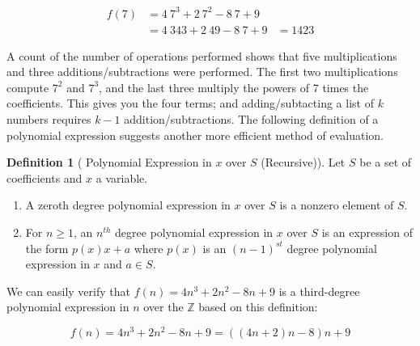 \documentclass[10pt,]{book}
\theoremstyle{plain}
\theoremstyle{definition}
\newtheorem{definition}[theorem]{Definition}
\theoremstyle{definition}
\theoremstyle{definition}
\theoremstyle{definition}
\numberwithin{equation}{section}
\begin{document}
\begin{equation*}
\begin{split}
f(7) &= 4\ 7^3 + 2\ 7^2 - 8\ 7 + 9\\
			&=4\ 343 +2\ 49 -8\ 7+9 
			&= 1423
\end{split}
\end{equation*}
%
\par
A count of the number of operations performed shows that five multiplications and three additions/subtractions were performed. The first two multiplications compute \(7^2\) and \(7^3\), and the last three multiply the powers of 7 times the coefficients. This gives you the
four terms; and adding/subtacting a list of \(k\) numbers requires \(k-1\) addition/subtractions. The following definition of a polynomial
expression suggests another more efficient method of evaluation.%
\begin{definition}[ Polynomial Expression in \(x\) over \(S\) (Recursive)]\label{def-polynomial-expression-recursive}
Let \(S\) be a set of coefficients and \(x\) a variable.%
\par
\leavevmode%
\begin{enumerate}[label=\alph*]
\item\hypertarget{li-4}{}A zeroth degree polynomial expression in \(x\) over \(S\) is a nonzero element of \(S\).%
\item\hypertarget{li-5}{}For \(n\geq 1\), an \(n^{th}\) degree polynomial expression in \(x\) over \(S\) is an expression of the form \(p(x)x + a\) where \(p(x)\) is
an \((n-1)^{st}\) degree polynomial expression in \(x\) and \(a\in  S\).%
\end{enumerate}
%
\end{definition}
\par
We can easily verify that \(f(n) = 4n^3 + 2n^2 - 8n + 9\) is a third-degree polynomial expression in  \(n\) over the \(\mathbb{Z}\) based on this definition:

\[f(n)= 4n^3 + 2n^2 - 8n + 9 = ((4n+2)n-8)n+9\]
\end{document}
